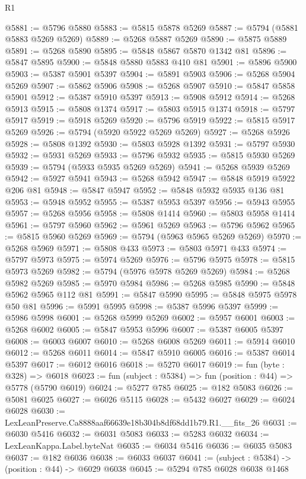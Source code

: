 \begin{lexlean}{R1}
\begin{coremodule}
@5881 := @5796 @5880
@5883 := @5815 @5878 @5269
@5887 := @5794 (@5881 @5883 @5269 @5269)
@5889 := @5268 @5887 @5269
@5890 := @5875 @5889
@5891 := @5268 @5890
@5895 := @5848 @5867 @5870 @1342 @81
@5896 := @5847 @5895
@5900 := @5848 @5880 @5883 @410 @81
@5901 := @5896 @5900
@5903 := @5387 @5901 @5397
@5904 := @5891 @5903
@5906 := @5268 @5904 @5269
@5907 := @5862 @5906
@5908 := @5268 @5907
@5910 := @5847 @5858 @5901
@5912 := @5387 @5910 @5397
@5913 := @5908 @5912
@5914 := @5268 @5913
@5915 := @5808 @1374
@5917 := @5803 @5915 @1374
@5918 := @5797 @5917
@5919 := @5918 @5269
@5920 := @5796 @5919
@5922 := @5815 @5917 @5269
@5926 := @5794 (@5920 @5922 @5269 @5269)
@5927 := @5268 @5926
@5928 := @5808 @1392
@5930 := @5803 @5928 @1392
@5931 := @5797 @5930
@5932 := @5931 @5269
@5933 := @5796 @5932
@5935 := @5815 @5930 @5269
@5939 := @5794 (@5933 @5935 @5269 @5269)
@5941 := @5268 @5939 @5269
@5942 := @5927 @5941
@5943 := @5268 @5942
@5947 := @5848 @5919 @5922 @206 @81
@5948 := @5847 @5947
@5952 := @5848 @5932 @5935 @136 @81
@5953 := @5948 @5952
@5955 := @5387 @5953 @5397
@5956 := @5943 @5955
@5957 := @5268 @5956
@5958 := @5808 @1414
@5960 := @5803 @5958 @1414
@5961 := @5797 @5960
@5962 := @5961 @5269
@5963 := @5796 @5962
@5965 := @5815 @5960 @5269
@5969 := @5794 (@5963 @5965 @5269 @5269)
@5970 := @5268 @5969
@5971 := @5808 @433
@5973 := @5803 @5971 @433
@5974 := @5797 @5973
@5975 := @5974 @5269
@5976 := @5796 @5975
@5978 := @5815 @5973 @5269
@5982 := @5794 (@5976 @5978 @5269 @5269)
@5984 := @5268 @5982 @5269
@5985 := @5970 @5984
@5986 := @5268 @5985
@5990 := @5848 @5962 @5965 @112 @81
@5991 := @5847 @5990
@5995 := @5848 @5975 @5978 @50 @81
@5996 := @5991 @5995
@5998 := @5387 @5996 @5397
@5999 := @5986 @5998
@6001 := @5268 @5999 @5269
@6002 := @5957 @6001
@6003 := @5268 @6002
@6005 := @5847 @5953 @5996
@6007 := @5387 @6005 @5397
@6008 := @6003 @6007
@6010 := @5268 @6008 @5269
@6011 := @5914 @6010
@6012 := @5268 @6011
@6014 := @5847 @5910 @6005
@6016 := @5387 @6014 @5397
@6017 := @6012 @6016
@6018 := @5270 @6017
@6019 := fun (byte : @328) => @6018
@6023 := fun (subject : @5384) => fun (position : @44) => @5778 (@5790 @6019)
@6024 := @5277 @785
@6025 := @182 @5083
@6026 := @5081 @6025
@6027 := @6026 @5115
@6028 := @5432 @6027
@6029 := @6024 @6028
@6030 := LexLeanPreserve.Ca8888aaf66639e18b304b8df68dd1b79.R1.__fits_26
@6031 := @6030 @5416
@6032 := @6031 @5083
@6033 := @5283 @6032
@6034 := LexLeanKappa.Label.byteNat
@6035 := @6034 @5416
@6036 := @6035 @5083
@6037 := @182 @6036
@6038 := @6033 @6037
@6041 := (subject : @5384) -> (position : @44) -> @6029 @6038
@6045 := @5294 @785 @6028 @6038 @1468

\end{coremodule}
\end{lexlean}
